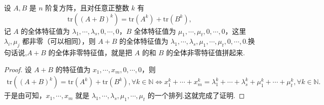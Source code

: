 \documentclass[../../main.tex]{subfiles}%
\begin{document}
\begin{proposition}\label{proposition:命题24}
设 $A,B$ 是 $n$ 阶复方阵，且对任意正整数 $k$ 有 $$\mathrm{tr}((A+B)^k)=\mathrm{tr}(A^k)+\mathrm{tr}(B^k),$$记 $A$ 的全体特征值为 $\lambda_1,\cdots,\lambda_s,0,\cdots,0$，$B$ 全体特征值为 $\mu_1,\cdots,\mu_t,0,\cdots,0$，这里 $\lambda_i,\mu_j$ 都非零（可以相同），则 $A+B$ 的全体特征值为 $\lambda_1,\cdots,\lambda_s,\mu_1,\cdots,\mu_t,0,\cdots,0$.换句话说,$A+B$ 的全体非零特征值，就是把 $A$ 的和 $B$ 的全体非零特征值拼起来.
\end{proposition}
\begin{proof}

设 $A+B$ 的特征值为 $x_1,\cdots ,x_m,0,\cdots ,0$，则
\begin{align*}
\mathrm{tr}\left( \left( A+B \right) ^k \right) =\mathrm{tr}\left( A^k \right) +\mathrm{tr}\left( B^k \right) ,\forall k\in \mathbb{N} 
\Longleftrightarrow x_{1}^{k}+\cdots +x_{m}^{k}=\lambda _{1}^{k}+\cdots +\lambda _{s}^{k}+\mu _{1}^{k}+\cdots +\mu _{t}^{k},\forall k\in \mathbb{N} .
\end{align*}
于是由可知，$x_1,\cdots ,x_m$ 就是 $\lambda _1,\cdots ,\lambda _s,\mu _1,\cdots ,\mu _t$ 的一个排列.这就完成了证明.

\end{proof}
\end{document}
